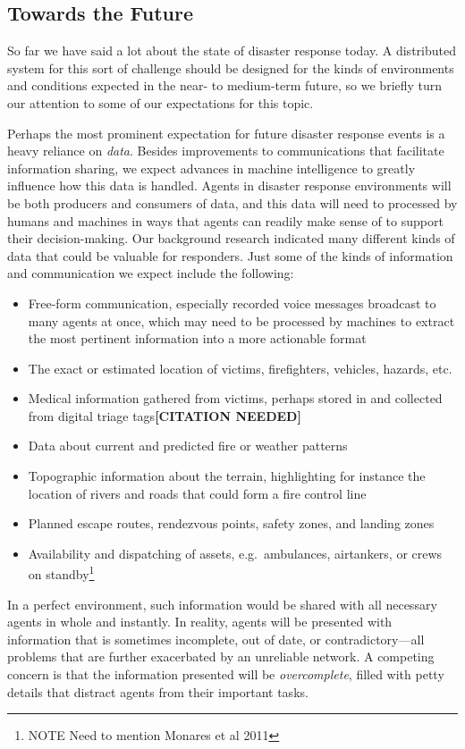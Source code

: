 \documentclass[]             %
{NASA}                       %
\theoremstyle{definition}
\newcommand{\citationneeded}{\textbf{[CITATION NEEDED]}}
\providecommand{\tightlist}{%
  \setlength{\itemsep}{0pt}\setlength{\parskip}{0pt}}
\begin{document}
\subsection{Towards the Future}
\label{towards-the-future}
So far we have said a lot about the state of disaster response
today. A distributed system for this sort of challenge should be
designed for the kinds of environments and conditions expected in the
near- to medium-term future, so we briefly turn our attention to some
of our expectations for this topic.

Perhaps the most prominent expectation for future disaster response
events is a heavy reliance on \emph{data}. Besides improvements to
communications that facilitate information sharing, we expect advances
in machine intelligence to greatly influence how this data is
handled. Agents in disaster response environments will be both
producers and consumers of data, and this data will need to processed
by humans and machines in ways that agents can readily make sense of
to support their decision-making. Our background research indicated
many different kinds of data that could be valuable for
responders. Just some of the kinds of information and communication we
expect include the following:
\begin{itemize}
  \tightlist
\item
  Free-form communication, especially recorded voice messages
  broadcast to many agents at once, which may need to be processed by
  machines to extract the most pertinent information into a more
  actionable format
\item
  The exact or estimated location of victims, firefighters, vehicles,
  hazards, etc.
\item
  Medical information gathered from victims, perhaps stored in and
  collected from digital triage tags\citationneeded
\item
  Data about current and predicted fire or weather patterns
\item
  Topographic information about the terrain, highlighting for instance
  the location of rivers and roads that could form a fire control line
\item
  Planned escape routes, rendezvous points, safety zones, and landing
  zones
\item
  Availability and dispatching of assets, e.g.~ambulances, airtankers,
  or crews on standby\footnote{NOTE Need to mention Monares et al 2011}
\end{itemize}
In a perfect environment, such information would be shared with all
necessary agents in whole and instantly. In reality, agents will be
presented with information that is sometimes incomplete, out of date,
or contradictory---all problems that are further exacerbated by an
unreliable network. A competing concern is that the information
presented will be \emph{overcomplete}, filled with petty details that
distract agents from their important tasks.
\end{document}
